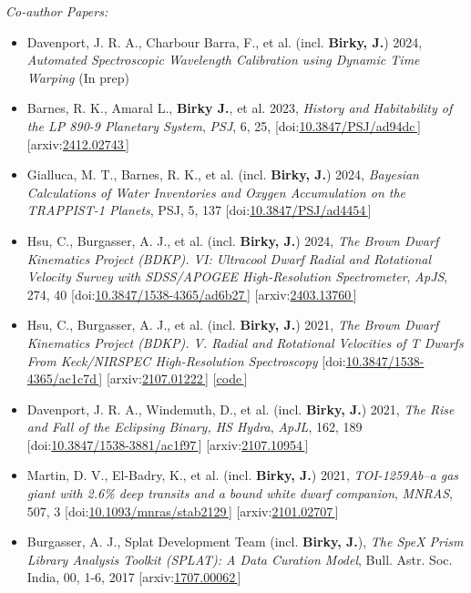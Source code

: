 \documentclass[a4,11pt]{article}
\let\orighref\href
\renewcommand{\href}[2]{\orighref{#1}{#2\,\scriptsize\faExternalLink}}
\begin{document}
\textsl{Co-author Papers:} 
\begin{itemize}[itemsep=0pt]
    \item Davenport, J. R. A., Charbour Barra, F., et al. (incl. \textbf{Birky, J.}) 2024, \textsl{Automated Spectroscopic Wavelength Calibration using Dynamic Time Warping} (In prep)
    \item Barnes, R. K., Amaral L., \textbf{Birky J.}, et al. 2023, \textsl{History and Habitability of the LP 890-9 Planetary System}, \textit{PSJ}, 6, 25, [doi:\href{https://iopscience.iop.org/article/10.3847/PSJ/ad94dc}{10.3847/PSJ/ad94dc}] [arxiv:\href{https://arxiv.org/abs/2412.02743}{2412.02743}] 
    \item Gialluca, M. T., Barnes, R. K.,  et al. (incl. \textbf{Birky, J.}) 2024, \textsl{Bayesian Calculations of Water Inventories and Oxygen Accumulation on the TRAPPIST-1 Planets}, PSJ, 5, 137  [doi:\href{https://iopscience.iop.org/article/10.3847/PSJ/ad4454/meta}{10.3847/PSJ/ad4454}]
    \item Hsu, C., Burgasser, A. J., et al. (incl. \textbf{Birky, J.}) 2024, \textsl{The Brown Dwarf Kinematics Project (BDKP). VI: Ultracool Dwarf Radial and Rotational Velocity Survey with SDSS/APOGEE High-Resolution Spectrometer}, \textit{ApJS}, 274, 40 [doi:\href{https://iopscience.iop.org/article/10.3847/1538-4365/ad6b27}{10.3847/1538-4365/ad6b27}] [arxiv:\href{https://arxiv.org/abs/2403.13760}{2403.13760}]
    \item Hsu, C., Burgasser, A. J., et al. (incl. \textbf{Birky, J.}) 2021, \textsl{The Brown Dwarf Kinematics Project (BDKP). V. Radial and Rotational Velocities of T Dwarfs From Keck/NIRSPEC High-Resolution Spectroscopy} [doi:\href{https://iopscience.iop.org/article/10.3847/1538-4365/ac1c7d/meta}{10.3847/1538-4365/ac1c7d}] [arxiv:\href{https://arxiv.org/abs/2107.01222}{2107.01222}] [\href{https://github.com/chihchunhsu/smart}{code}] 
    \item Davenport, J. R. A., Windemuth, D., et al. (incl. \textbf{Birky, J.}) 2021, \textsl{The Rise and Fall of the Eclipsing Binary, HS Hydra}, \textit{ApJL}, 162, 189 [doi:\href{https://iopscience.iop.org/article/10.3847/1538-3881/ac1f97}{10.3847/1538-3881/ac1f97}] [arxiv:\href{https://arxiv.org/abs/2107.10954}{2107.10954}] 
    \item Martin, D. V., El-Badry, K., et al. (incl. \textbf{Birky, J.}) 2021, \textsl{TOI-1259Ab--a gas giant with 2.6\% deep transits and a bound white dwarf companion}, \textit{MNRAS}, 507, 3 [doi:\href{https://academic.oup.com/mnras/article/507/3/4132/6329054}{10.1093/mnras/stab2129}]  [arxiv:\href{https://arxiv.org/abs/2101.02707}{2101.02707}]
    \item Burgasser, A. J., Splat Development Team (incl. \textbf{Birky, J.}), \textsl{The SpeX Prism Library Analysis Toolkit (SPLAT): A Data Curation Model}, Bull. Astr. Soc. India, 00, 1-6, 2017  [arxiv:\href{https://arxiv.org/abs/1707.00062}{1707.00062}]
\end{itemize}
\end{document}
